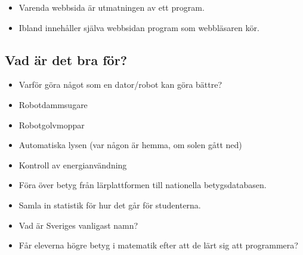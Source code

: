 \begin{frame}
  \begin{example}
    \begin{itemize}
      \item Varenda webbsida är utmatningen av ett program.
      \item Ibland innehåller själva webbsidan program som webbläsaren kör.
    \end{itemize}
  \end{example}
\end{frame}

\subsection{Vad är det bra för?}

\begin{frame}
  \begin{question}
    \begin{itemize}
      \item Varför göra något som en dator/robot kan göra bättre?
    \end{itemize}
  \end{question}
\end{frame}

\begin{frame}
  \begin{example}[Hemautomation]
    \begin{itemize}
      \item Robotdammsugare
      \item Robotgolvmoppar
      \item Automatiska lysen (var någon är hemma, om solen gått ned)
      \item Kontroll av energianvändning
    \end{itemize}
  \end{example}
\end{frame}

\begin{frame}
  \begin{example}
    \begin{itemize}
      \item Föra över betyg från lärplattformen till nationella 
        betygsdatabasen.
      \item Samla in statistik för hur det går för studenterna.
    \end{itemize}
  \end{example}

  \begin{example}
    \begin{itemize}
      \item Vad är Sveriges vanligast namn?
      \item Får eleverna högre betyg i matematik efter att de lärt sig att 
        programmera?
    \end{itemize}
  \end{example}
\end{frame}

